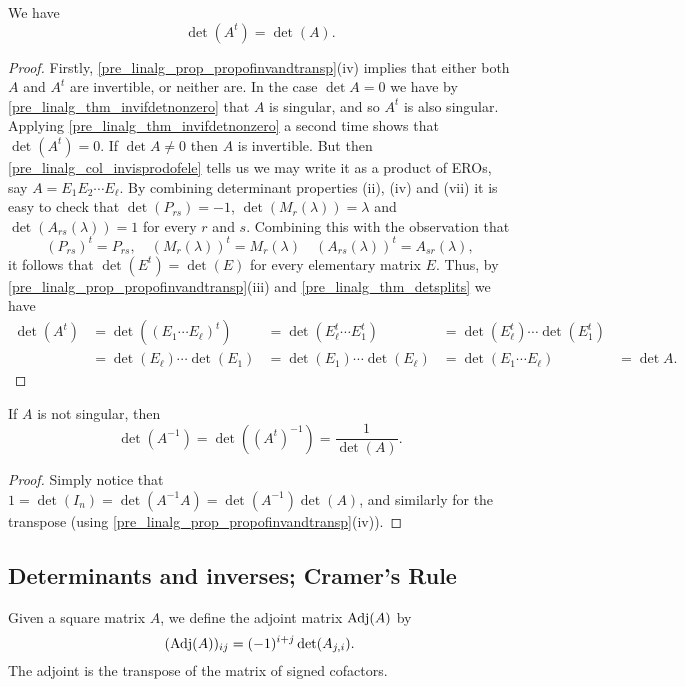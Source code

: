 \documentclass[10pt, a4paper]{article}
\begin{document}
\begin{theorem}
    We have
    \[
    \det(A ^ t) = \det(A).
    \]
    \begin{proof}
        Firstly,
        \autoref{pre_linalg_prop_propofinvandtransp}(iv) implies that either both $A$ and $A ^ t$ are invertible,
        or neither are.
        In the case $\det A = 0$ we have by \autoref{pre_linalg_thm_invifdetnonzero} that $A$ is singular,
        and so $A ^ t$ is also singular.
        Applying \autoref{pre_linalg_thm_invifdetnonzero} a second time shows that $\det(A ^ t) = 0$.
        If $\det A \neq 0$ then $A$ is invertible.
        But then \autoref{pre_linalg_col_invisprodofele} tells us we may write it as a product of EROs,
        say $A = E_1E_2\dotsi E_\ell$.
        By combining determinant properties (ii),
        (iv) and (vii) it is easy to check that $\det(P_{rs}) = -1$,
        $\det(M_r(\lambda)) = \lambda$ and $\det(A_{rs}(\lambda)) = 1$ for every $r$ and $s$.
        Combining this with the observation that
        \[
        (P_{rs}) ^ t = P_{rs},\quad(M_{r}(\lambda)) ^ t = M_r(\lambda)\quad(A_{rs}(\lambda)) ^ t = A_{sr}(\lambda),
        \]
        it follows that $\det(E ^ t) = \det(E)$ for every elementary matrix $E$.
        Thus,
        by \autoref{pre_linalg_prop_propofinvandtransp}(iii) and \autoref{pre_linalg_thm_detsplits} we have
        \begin{align*}
            \det(A ^ t) &= \det((E_1\dotsi E_\ell) ^ t) &= \det(E_\ell ^ t \dotsi E_1 ^ t) &= \det(E_\ell ^ t)\dotsi\det(E_1 ^ t) \\
            &= \det(E_\ell)\dotsi\det(E_1) &= \det(E_1)\dotsi\det(E_\ell) &= \det(E_1 \dotsi E_\ell) &= \det A.
        \end{align*}
    \end{proof}
\end{theorem}

\begin{corollary}
    If $A$ is not singular,
    then
    \[
    \det(A ^ {-1}) = \det((A ^ t) ^ {-1}) = \frac{1}{\det(A)}.
    \]
    \begin{proof}
        Simply notice that $1 = \det(I_n) = \det(A ^ {-1}A) = \det(A ^ {-1})\det(A)$,
        and similarly for the transpose (using \autoref{pre_linalg_prop_propofinvandtransp}(iv)).
    \end{proof}
\end{corollary}

\subsection{Determinants and inverses; Cramer's Rule}
\begin{definition}
    Given a square matrix $A$,
    we define the adjoint matrix $\operatorname{Adj}(A)$ by
    \[
    (\operatorname{Adj}(A))_{ij} = (-1) ^ {i + j}\det(A_{j, i}).
    \]
    The adjoint is the transpose of the matrix of signed cofactors.
\end{definition}
\end{document}
